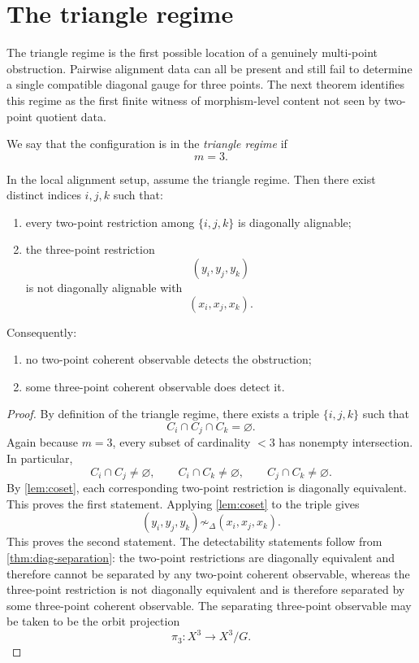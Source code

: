 \section{The triangle regime}
The triangle regime is the first possible location of a genuinely
multi-point obstruction.  Pairwise alignment data can all be present and
still fail to determine a single compatible diagonal gauge for three
points.  The next theorem identifies this regime as the first finite
witness of morphism-level content not seen by two-point quotient data.

\begin{definition}
	We say that the configuration is in the \emph{triangle regime} if
	\[
		m=3.
	\]
\end{definition}
\begin{theorem}
	\label{thm:triangle}
	In the local alignment setup, assume the triangle regime. Then there
	exist distinct indices
	\(i,j,k\) such that:
	\begin{enumerate}
		\item every two-point restriction among \(\{i,j,k\}\) is diagonally
		      alignable;
		\item the three-point restriction
		      \[
			      (y_i,y_j,y_k)
		      \]
		      is not diagonally alignable with
		      \[
			      (x_i,x_j,x_k).
		      \]
	\end{enumerate}
	Consequently:
	\begin{enumerate}
		\item no two-point coherent observable detects the obstruction;
		\item some three-point coherent observable does detect it.
	\end{enumerate}
\end{theorem}
\begin{proof}
	By definition of the triangle regime, there exists a triple
	\(\{i,j,k\}\) such that
	\[
		C_i\cap C_j\cap C_k=\varnothing.
	\]
	Again because \(m=3\), every subset of cardinality \(<3\) has nonempty
	intersection. In particular,
	\[
		C_i\cap C_j\neq\varnothing,
		\qquad
		C_i\cap C_k\neq\varnothing,
		\qquad
		C_j\cap C_k\neq\varnothing.
	\]
	By \cref{lem:coset}, each corresponding two-point restriction is
	diagonally equivalent. This proves the first statement.
	Applying \cref{lem:coset} to the triple gives
	\[
		(y_i,y_j,y_k)\not\sim_\Delta (x_i,x_j,x_k).
	\]
	This proves the second statement.
	The detectability statements follow from \cref{thm:diag-separation}:
	the two-point restrictions are diagonally equivalent and therefore
	cannot be separated by any two-point coherent observable, whereas the
	three-point restriction is not diagonally equivalent and is therefore
	separated by some three-point coherent observable. The separating
	three-point observable may be taken to be the orbit projection
	\[
		\pi_3:X^3\to X^3/G.
	\]
\end{proof}
